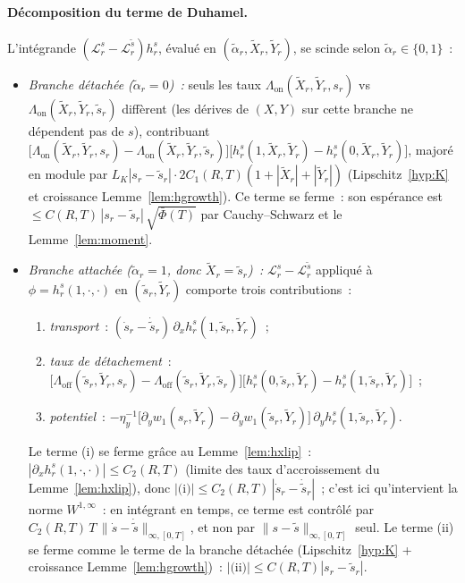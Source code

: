 \documentclass[11pt,a4paper]{article}
\newcommand{\Lon}{\Lambda_{\mathrm{on}}}
\newcommand{\Loff}{\Lambda_{\mathrm{off}}}
\theoremstyle{plain}
\theoremstyle{definition}
\begin{document}
\paragraph{D\'ecomposition du terme de Duhamel.} L'int\'egrande $(\mathcal L^s_r-\mathcal L^{\tilde s}_r)h^s_r$, \'evalu\'e en $(\tilde\alpha_r,\tilde X_r,\tilde Y_r)$, se scinde selon $\tilde\alpha_r\in\{0,1\}$~:
\begin{itemize}
\item \emph{Branche d\'etach\'ee ($\tilde\alpha_r=0$)~:} seuls les taux $\Lon(\tilde X_r,\tilde Y_r,s_r)$ vs $\Lon(\tilde X_r,\tilde Y_r,\tilde s_r)$ diff\`erent (les d\'erives de $(X,Y)$ sur cette branche ne d\'ependent pas de $s$), contribuant $\big[\Lon(\tilde X_r,\tilde Y_r,s_r)-\Lon(\tilde X_r,\tilde Y_r,\tilde s_r)\big]\big[h^s_r(1,\tilde X_r,\tilde Y_r)-h^s_r(0,\tilde X_r,\tilde Y_r)\big]$, major\'e en module par $L_K|s_r-\tilde s_r|\cdot 2C_1(R,T)(1+|\tilde X_r|+|\tilde Y_r|)$ (Lipschitz~\ref{hyp:K} et croissance Lemme~\ref{lem:hgrowth}). Ce terme se ferme~: son esp\'erance est $\le C(R,T)\,|s_r-\tilde s_r|\,\sqrt{\bar\Phi(T)}$ par Cauchy--Schwarz et le Lemme~\ref{lem:moment}.
\item \emph{Branche attach\'ee ($\tilde\alpha_r=1$, donc $\tilde X_r=\tilde s_r$)~:} $\mathcal L^s_r-\mathcal L^{\tilde s}_r$ appliqu\'e \`a $\phi=h^s_r(1,\cdot,\cdot)$ en $(\tilde s_r,\tilde Y_r)$ comporte trois contributions~:
\begin{enumerate}
\item[(i)] \emph{transport}~: $(\dot s_r-\dot{\tilde s}_r)\,\partial_xh^s_r(1,\tilde s_r,\tilde Y_r)$~;
\item[(ii)] \emph{taux de d\'etachement}~: $\big[\Loff(\tilde s_r,\tilde Y_r,s_r)-\Loff(\tilde s_r,\tilde Y_r,\tilde s_r)\big]\big[h^s_r(0,\tilde s_r,\tilde Y_r)-h^s_r(1,\tilde s_r,\tilde Y_r)\big]$~;
\item[(iii)] \emph{potentiel}~: $-\eta_y^{-1}\big[\partial_yw_1(s_r,\tilde Y_r)-\partial_yw_1(\tilde s_r,\tilde Y_r)\big]\,\partial_yh^s_r(1,\tilde s_r,\tilde Y_r)$.
\end{enumerate}
Le terme (i) se ferme gr\^ace au Lemme~\ref{lem:hxlip}~: $|\partial_xh^s_r(1,\cdot,\cdot)|\le C_2(R,T)$ (limite des taux d'accroissement du Lemme~\ref{lem:hxlip}), donc $|\text{(i)}|\le C_2(R,T)\,|\dot s_r-\dot{\tilde s}_r|$~; c'est ici qu'intervient la norme $W^{1,\infty}$~: en int\'egrant en temps, ce terme est contr\^ol\'e par $C_2(R,T)\,T\,\|\dot s-\dot{\tilde s}\|_{\infty,[0,T]}$, et non par $\|s-\tilde s\|_{\infty,[0,T]}$ seul. Le terme (ii) se ferme comme le terme de la branche d\'etach\'ee (Lipschitz~\ref{hyp:K} + croissance Lemme~\ref{lem:hgrowth})~: $|\text{(ii)}|\le C(R,T)|s_r-\tilde s_r|$.


\end{itemize}
\end{document}
